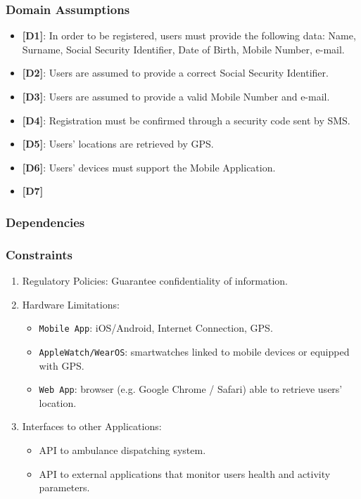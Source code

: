 \documentclass[12pt,a4paper]{article}
\begin{document}
			\subsubsection{Domain Assumptions}
			\begin{itemize}
				\item {\textbf[}\textbf{D1}{\textbf]}: In order to be registered, users must provide the following data: Name, Surname, Social Security Identifier, Date of Birth, Mobile Number, e-mail.
				\item {\textbf[}\textbf{D2}{\textbf]}: Users are assumed to provide a correct Social Security Identifier.
				\item {\textbf[}\textbf{D3}{\textbf]}: Users are assumed to provide a valid Mobile Number and e-mail.
				\item {\textbf[}\textbf{D4}{\textbf]}: Registration must be confirmed through a security code sent by SMS.
				\item {\textbf[}\textbf{D5}{\textbf]}: Users' locations are retrieved by GPS.
				\item {\textbf[}\textbf{D6}{\textbf]}: Users' devices must support the Mobile Application.
				\item {\textbf[}\textbf{D7}{\textbf]}
			\end{itemize}
			\subsubsection{Dependencies}
			\subsubsection{Constraints}
				\begin{enumerate}
					\item Regulatory Policies:
							Guarantee confidentiality of information.
					\item Hardware Limitations: 
						\begin{itemize}
							\item \texttt{Mobile App}: iOS/Android, Internet Connection, GPS.
							\item \texttt{AppleWatch/WearOS}: smartwatches linked to mobile devices or equipped with GPS.
							\item \texttt{Web App}: browser (e.g. Google Chrome / Safari) able to retrieve users' location.
						\end{itemize}
					\item Interfaces to other Applications: 
						\begin{itemize}
							\item API to ambulance dispatching system.
							\item API to external applications that monitor users health and activity parameters.
						\end{itemize}
				\end{enumerate}
		
\end{document}
